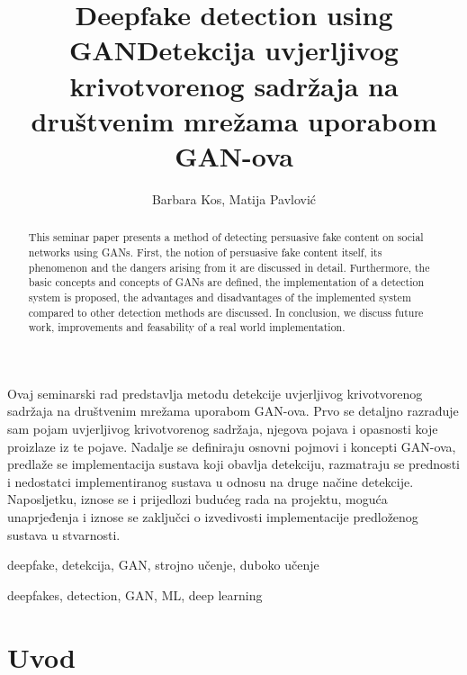 \documentclass[seminarski, times, utf8]{fer}
\title{Deepfake detection using GAN}
\title{Detekcija uvjerljivog krivotvorenog sadržaja na društvenim mrežama uporabom GAN-ova}
\author{Barbara Kos, Matija Pavlović}
\date{}
\date{}
\begin{document}
\maketitle



\begin{sazetak}
Ovaj seminarski rad predstavlja metodu detekcije uvjerljivog krivotvorenog sadržaja na društvenim mrežama uporabom GAN-ova. Prvo se detaljno razrađuje sam pojam uvjerljivog krivotvorenog sadržaja, njegova pojava i opasnosti koje proizlaze iz te pojave.
Nadalje se definiraju osnovni pojmovi i koncepti GAN-ova, predlaže se implementacija sustava koji obavlja detekciju, razmatraju se prednosti i nedostatci implementiranog sustava u odnosu na druge načine detekcije. 
Naposljetku, iznose se i prijedlozi budućeg rada na projektu, moguća unaprjeđenja i iznose se zaključci o izvedivosti implementacije predloženog sustava u stvarnosti.
\end{sazetak}

\begin{kljucnerijeci}
deepfake, detekcija, GAN, strojno učenje, duboko učenje
\end{kljucnerijeci}

\begin{abstract}
This seminar paper presents a method of detecting persuasive fake content on social networks using GANs. First, the notion of persuasive fake content itself, its phenomenon and the dangers arising from it are discussed in detail. 
Furthermore, the basic concepts and concepts of GANs are defined, the implementation of a detection system is proposed, the advantages and disadvantages of the implemented system compared to other detection methods are discussed. 
In conclusion, we discuss future work, improvements and feasability of a real world implementation.
\end{abstract}

\begin{keywords}
 deepfakes, detection, GAN, ML, deep learning
\end{keywords}


\tableofcontents


\chapter{Uvod}
\label{pog:uvod}
\end{document}
